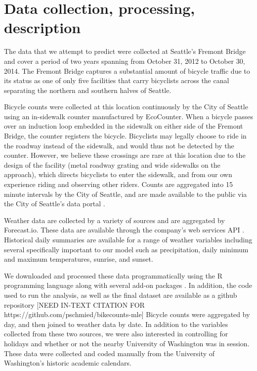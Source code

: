 \documentclass[12pt,letterpaper,article]{memoir}
\begin{document}
\FloatBarrier
\section*{Data collection, processing, description}
%
% 

The data that we attempt to predict were collected at Seattle's
Fremont Bridge and cover a period of two years spanning from October
31, 2012 to October 30, 2014. The Fremont Bridge captures a
substantial amount of bicycle traffic due to its status as one of only
five facilities that carry bicyclists across the canal separating the
northern and southern halves of Seattle.

Bicycle counts were collected at this location continuously by the
City of Seattle using an in-sidewalk counter manufactured by
EcoCounter. When a bicycle passes over an induction loop embedded in
the sidewalk on either side of the Fremont Bridge, the counter
registers the bicycle. Bicyclists may legally choose to ride in the
roadway instead of the sidewalk, and would thus not be detected by the
counter. However, we believe these crossings are rare at this location
due to the design of the facility (metal roadway grating and wide
sidewalks on the approach), which directs bicyclists to enter the
sidewalk, and from our own experience riding and observing other
riders. Counts are aggregated into 15 minute intervals by the City of
Seattle, and are made available to the public via the City of
Seattle's data
portal \parencite{City-of-Seattle:aa,City-of-Seattle:ab}.

Weather data are collected by a variety of sources and are aggregated
by Forecast.io. These data are available through the company's web
services API \parencite{The-Dark-Sky-Company:aa}. Historical daily
summaries are available for a range of weather variables including
several specifically important to our model such as precipitation,
daily minimum and maximum temperatures, sunrise, and sunset.

We downloaded and processed these data programmatically using the R
programming language along with several add-on
packages \parencite{Grolemund:2011aa,Wickham:2011aa,Couture-Beil:2014aa,Lang:2014aa,R-Core-Team:2014aa}. In
addition, the code used to run the analysis, as well as the final
dataset are available as a github repository [NEED IN-TEXT CITATION FOR https://github.com/pschmied/bikecounts-mle]
Bicycle counts were aggregated by day, and then joined to weather data
by date. In addition to the variables collected from these two
sources, we were also interested in controlling for holidays and
whether or not the nearby University of Washington was in session.
These data were collected and coded manually from the University of
Washington's historic academic calendars.
\end{document}
